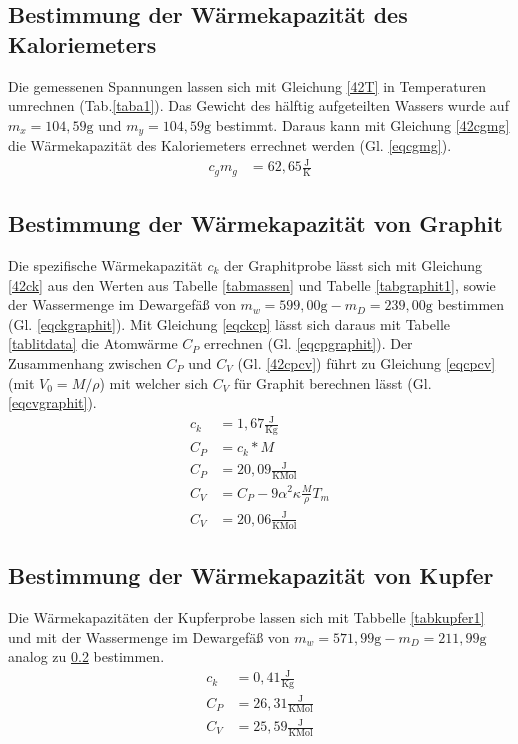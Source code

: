 \subsection{Bestimmung der Wärmekapazität des Kaloriemeters}
 
Die gemessenen Spannungen lassen sich mit Gleichung \ref{42T} in Temperaturen umrechnen (Tab.\ref{taba1}).
Das Gewicht des hälftig aufgeteilten Wassers wurde auf $m_x=104,59\text{g}$ und $m_y=104,59\text{g}$ 
bestimmt. Daraus kann mit Gleichung \ref{42cgmg} die Wärmekapazität des Kaloriemeters errechnet werden 
(Gl. \ref{eqcgmg}).
\begin{align}
	c_gm_g&=62,65\frac{\text{J}}{\text{K}} \label{eqcgmg}
\end{align}
\subsection{Bestimmung der Wärmekapazität von Graphit} \label{subsec:graphit}
 
Die spezifische Wärmekapazität $c_k$ der Graphitprobe lässt sich mit Gleichung \ref{42ck} aus den Werten aus
Tabelle \ref{tabmassen} und Tabelle \ref{tabgraphit1}, sowie der Wassermenge im Dewargefäß von 
$m_w=599,00\text{g}-m_D=239,00\text{g}$ bestimmen (Gl. \ref{eqckgraphit}). Mit Gleichung \ref{eqckcp} lässt
sich daraus mit Tabelle \ref{tablitdata} die Atomwärme $C_P$ errechnen (Gl. \ref{eqcpgraphit}).
Der Zusammenhang zwischen $C_P$ und $C_V$ (Gl. \ref{42cpcv}) führt zu Gleichung \ref{eqcpcv} (mit 
$V_0=M/\rho$) mit welcher sich $C_V$ für Graphit berechnen lässt (Gl. \ref{eqcvgraphit}).
\begin{align}
c_k&=1,67 \frac{\text{J}}{\text{K} \text{g}} \label{eqckgraphit}\\
C_P&=c_k * M \label{eqckcp} \\
C_P&=20,09 \frac{\text{J}}{\text{K} \text{Mol}} \label{eqcpgraphit} \\
C_V&= C_P - 9 \alpha^2 \kappa \frac{M}{\rho} T_m \label{eqcpcv}\\
C_V&= 20,06 \frac{\text{J}}{\text{K} \text{Mol}} \label{eqcvgraphit}
\end{align}
\subsection{Bestimmung der Wärmekapazität von Kupfer}

Die Wärmekapazitäten der Kupferprobe lassen sich mit Tabbelle \ref{tabkupfer1} und mit 
der Wassermenge im Dewargefäß von $m_w=571,99\text{g}-m_D=211,99\text{g}$ 
analog zu \ref{subsec:graphit} bestimmen.
\begin{align}
c_k&=0,41 \frac{\text{J}}{\text{K} \text{g}} \\
C_P&=26,31 \frac{\text{J}}{\text{K} \text{Mol}} \\
C_V&=25,59  \frac{\text{J}}{\text{K} \text{Mol}} 
\end{align}
